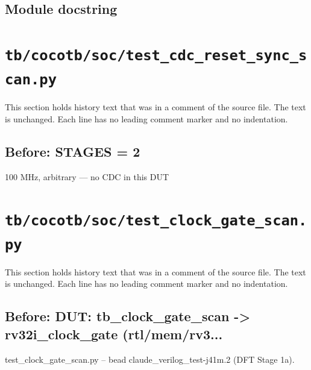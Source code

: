 \begin{record}

\subsection*{Module docstring}


\end{record}

\section{\texttt{tb/cocotb/soc/test\_cdc\_reset\_sync\_scan.py}}\label{cr:suite:soc-test-cdc-reset-sync-scan}

This section holds history text that was in a comment of the source file. The text is unchanged. Each line has no leading comment marker and no indentation.

\begin{record}

\subsection*{Before: STAGES = 2}

\begin{textblock}
100 MHz, arbitrary — no CDC in this DUT
\end{textblock}

\end{record}

\section{\texttt{tb/cocotb/soc/test\_clock\_gate\_scan.py}}\label{cr:suite:soc-test-clock-gate-scan}

This section holds history text that was in a comment of the source file. The text is unchanged. Each line has no leading comment marker and no indentation.

\begin{record}

\subsection*{Before: DUT: tb\_clock\_gate\_scan -> rv32i\_clock\_gate (rtl/mem/rv3...}

\begin{textblock}
test_clock_gate_scan.py -- bead claude_verilog_test-j41m.2 (DFT Stage 1a).
\end{textblock}

\end{record}

